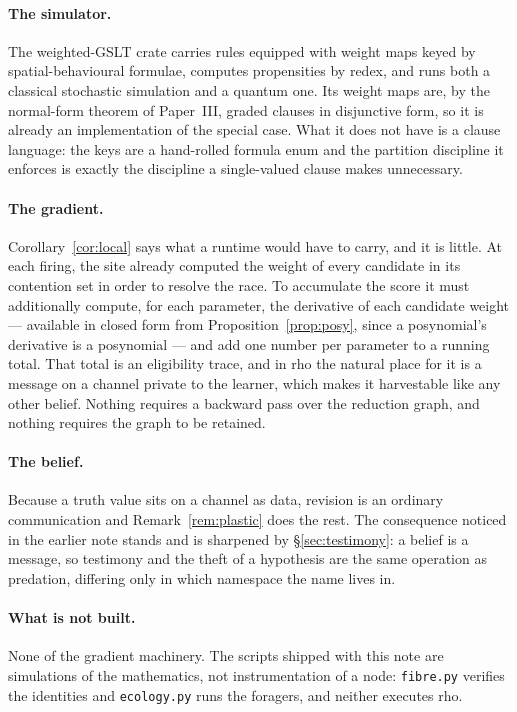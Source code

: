 \documentclass[11pt,a4paper]{article}
\theoremstyle{plain}
\theoremstyle{definition}
\theoremstyle{remark}
\newcommand{\rhoc}{\textsf{rho}}
\begin{document}
\paragraph{The simulator.} The weighted-GSLT crate carries rules equipped with
weight maps keyed by spatial-behavioural formulae, computes propensities by
redex, and runs both a classical stochastic simulation and a quantum one. Its
weight maps are, by the normal-form theorem of Paper~III, graded clauses in
disjunctive form, so it is already an implementation of the special case. What it
does not have is a clause language: the keys are a hand-rolled formula enum and
the partition discipline it enforces is exactly the discipline a single-valued
clause makes unnecessary.

\paragraph{The gradient.} Corollary~\ref{cor:local} says what a runtime would
have to carry, and it is little. At each firing, the site already computed the
weight of every candidate in its contention set in order to resolve the race. To
accumulate the score it must additionally compute, for each parameter, the
derivative of each candidate weight --- available in closed form from
Proposition~\ref{prop:posy}, since a posynomial's derivative is a posynomial ---
and add one number per parameter to a running total. That total is an eligibility
trace, and in \rhoc{} the natural place for it is a message on a channel private
to the learner, which makes it harvestable like any other belief. Nothing
requires a backward pass over the reduction graph, and nothing requires the graph
to be retained.

\paragraph{The belief.} Because a truth value sits on a channel as data, revision
is an ordinary communication and Remark~\ref{rem:plastic} does the rest. The
consequence noticed in the earlier note stands and is sharpened by
\S\ref{sec:testimony}: a belief is a message, so testimony and the theft of a
hypothesis are the same operation as predation, differing only in which namespace
the name lives in.

\paragraph{What is not built.} None of the gradient machinery. The scripts
shipped with this note are simulations of the mathematics, not instrumentation of
a node: \texttt{fibre.py} verifies the identities and \texttt{ecology.py} runs the
foragers, and neither executes \rhoc{}.
\end{document}
